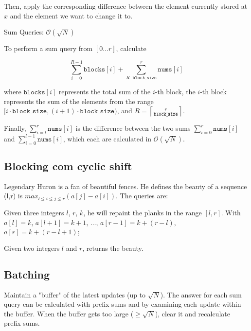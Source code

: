         Then, apply the corresponding difference between the element currently stored at
        $x$ and the element we want to change it to.
        
        Sum Queries: $\mathcal{O}(\sqrt{N})$
        
        To perform a sum query from $[0\ldots r]$, calculate
        
        $$\sum_{i = 0}^{R-1} \texttt{blocks}[i] + \sum_{R \cdot \texttt{block\_size}}^r \texttt{nums}[i]$$
        
        where $\texttt{blocks}[i]$ represents the total sum of the $i$-th block, the
        $i$-th block represents the sum of the elements from the range $[i\cdot \texttt{block\_size},(i + 1)\cdot \texttt{block\_size})$, and $R=\left\lceil \frac{r}{\texttt{block\_size}} \right\rceil$.
        
        Finally, $\sum_{i=l}^{r} \texttt{nums}[i]$ is the difference between the two
        sums $\sum_{i=0}^{r}\texttt{nums}[i]$ and $\sum_{i=0}^{l-1}\texttt{nums}[i]$,
        which each are calculated in $\mathcal{O}(\sqrt N)$.

        
        \subsection{Blocking com cyclic shift}
        \tab Legendary Huron is a fan of beautiful fences. He defines the beauty of a sequence (l,r) is $max_{l \leq i \leq j \leq r}(a[j]-a[i])$. The
        queries are:
        
        Given three integers $l$, $r$, $k$, he will repaint the planks in the range $[l,r]$. With $a[l] = k$, $a[l+1] = k+1$, $\dots$, $a[r-1] = k + (r-l)$, $a[r] = k + (r-l+1)$;
        
        Given two integers $l$ and $r$, returns the beauty.
        
        \subsection{Batching}
        \tab Maintain a "buffer" of the latest updates (up to $\sqrt N$). The answer for each
        sum query can be calculated with prefix sums and by examining each update within
        the buffer. When the buffer gets too large ($\ge \sqrt N$), clear it and
        recalculate prefix sums.
        
        
        

